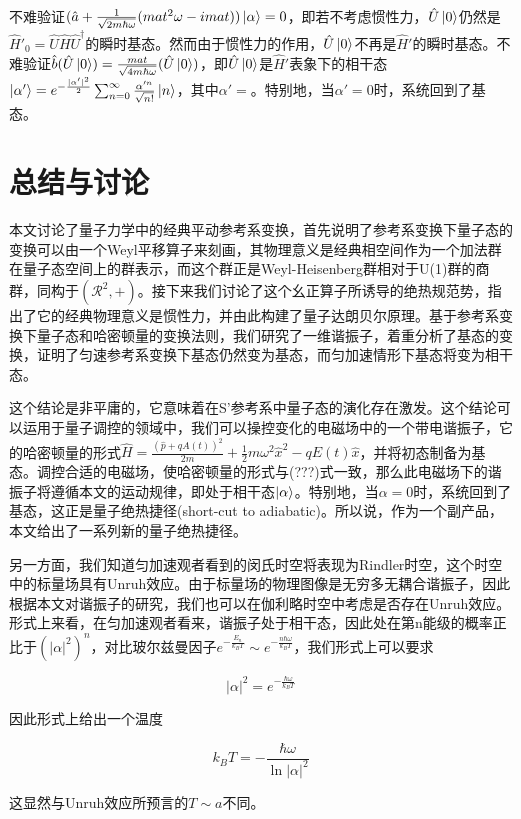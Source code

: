 \documentclass[a4paper]{article}
\begin{document}
            不难验证$(\hat{a}+\frac{1}{\sqrt{2m\hbar\omega}}(mat^2\omega-imat))\ket{\alpha}=0$，即若不考虑惯性力，$\hat{U}\ket{0}$仍然是$\hat{H}'_0=\hat{U}\hat{H}\hat{U}^\dagger$的瞬时基态。然而由于惯性力的作用，$\hat{U}\ket{0}$不再是$\hat{H}'$的瞬时基态。不难验证$\hat{b}(\hat{U}\ket{0})=\frac{mat}{\sqrt{4m\hbar\omega}}(\hat{U}\ket{0})$，即$\hat{U}\ket{0}$是$\hat{H}'$表象下的相干态$\ket{\alpha'}=e^{-\frac{|\alpha'|^2}{2}}\sum_{n=0}^\infty\frac{\alpha'^n}{\sqrt{n!}}\ket{n}$，其中$\alpha'=$。特别地，当$\alpha'=0$时，系统回到了基态。




    \section{总结与讨论}

        本文讨论了量子力学中的经典平动参考系变换，首先说明了参考系变换下量子态的变换可以由一个Weyl平移算子来刻画，其物理意义是经典相空间作为一个加法群在量子态空间上的群表示，而这个群正是Weyl-Heisenberg群相对于U(1)群的商群，同构于$(\mathcal{R}^2,+)$。接下来我们讨论了这个幺正算子所诱导的绝热规范势，指出了它的经典物理意义是惯性力，并由此构建了量子达朗贝尔原理。基于参考系变换下量子态和哈密顿量的变换法则，我们研究了一维谐振子，着重分析了基态的变换，证明了匀速参考系变换下基态仍然变为基态，而匀加速情形下基态将变为相干态。

        这个结论是非平庸的，它意味着在S'参考系中量子态的演化存在激发。这个结论可以运用于量子调控的领域中，我们可以操控变化的电磁场中的一个带电谐振子，它的哈密顿量的形式$\hat{H}=\frac{(\hat{p}+qA(t))^2}{2m}+\frac{1}{2}m\omega^2\hat{x}^2-qE(t)\hat{x}$，并将初态制备为基态。调控合适的电磁场，使哈密顿量的形式与(???)式一致，那么此电磁场下的谐振子将遵循本文的运动规律，即处于相干态$\ket{\alpha}$。特别地，当$\alpha=0$时，系统回到了基态，这正是量子绝热捷径(short-cut to adiabatic)。所以说，作为一个副产品，本文给出了一系列新的量子绝热捷径。

        另一方面，我们知道匀加速观者看到的闵氏时空将表现为Rindler时空，这个时空中的标量场具有Unruh效应。由于标量场的物理图像是无穷多无耦合谐振子，因此根据本文对谐振子的研究，我们也可以在伽利略时空中考虑是否存在Unruh效应。形式上来看，在匀加速观者看来，谐振子处于相干态，因此处在第n能级的概率正比于$(|\alpha|^2)^n$，对比玻尔兹曼因子$e^{-\frac{E_n}{k_BT}}\sim e^{-\frac{n\hbar\omega}{k_BT}}$，我们形式上可以要求

        \begin{equation}
            |\alpha|^2=e^{-\frac{\hbar\omega}{k_BT}}
        \end{equation}

        因此形式上给出一个温度

        \begin{equation}
            k_BT=-\frac{\hbar\omega}{\ln|\alpha|^2}
        \end{equation}

        这显然与Unruh效应所预言的$T\sim a$不同。

        
\end{document}
